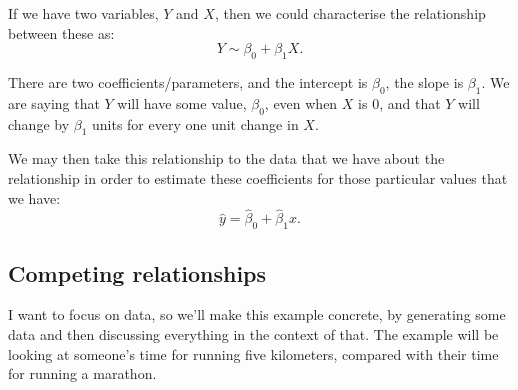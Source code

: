 \documentclass[
]{book}
\begin{document}
If we have two variables, \(Y\) and \(X\), then we could characterise the relationship between these as:
\[Y \sim \beta_0 + \beta_1 X.\]

There are two coefficients/parameters, and the intercept is \(\beta_0\), the slope is \(\beta_1\). We are saying that \(Y\) will have some value, \(\beta_0\), even when \(X\) is 0, and that \(Y\) will change by \(\beta_1\) units for every one unit change in \(X\).

We may then take this relationship to the data that we have about the relationship in order to estimate these coefficients for those particular values that we have:
\[\hat{y} = \hat{\beta}_0 + \hat{\beta}_1 x.\]

\hypertarget{competing-relationships}{%
\subsection{Competing relationships}\label{competing-relationships}}

I want to focus on data, so we'll make this example concrete, by generating some data and then discussing everything in the context of that. The example will be looking at someone's time for running five kilometers, compared with their time for running a marathon.
\end{document}
